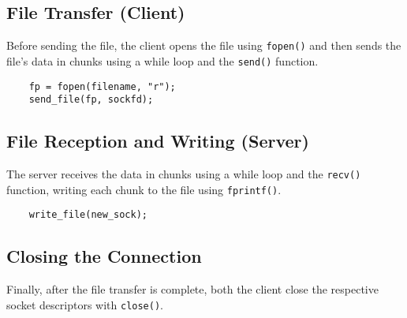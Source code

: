 \subsection{File Transfer (Client)}

Before sending the file, the client opens the file using \verb|fopen()| and then sends the file's data in chunks using a while loop and the \verb|send()| function.
\begin{verbatim}
    fp = fopen(filename, "r");
    send_file(fp, sockfd);
\end{verbatim}

\subsection{File Reception and Writing (Server)}

The server receives the data in chunks using a while loop and the \verb|recv()| function, writing each chunk to the file using \verb|fprintf()|.
\begin{verbatim}
    write_file(new_sock);
\end{verbatim}

\subsection{Closing the Connection}

Finally, after the file transfer is complete, both the client close the respective socket descriptors with \verb|close()|.
